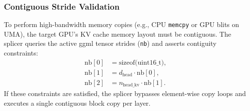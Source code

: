 \documentclass[conference,10pt]{IEEEtran}
\begin{document}
\subsubsection{Contiguous Stride Validation}
To perform high-bandwidth memory copies (e.g., CPU \texttt{memcpy} or GPU blits on UMA), the target GPU's KV cache memory layout must be contiguous. The splicer queries the active ggml tensor strides (\texttt{nb}) and asserts contiguity constraints:
\begin{align}
\text{nb}[0] &= \text{sizeof(uint16\_t)}, \\
\text{nb}[1] &= d_{\text{head}} \cdot \text{nb}[0], \\
\text{nb}[2] &= n_{\text{head\_kv}} \cdot \text{nb}[1].
\end{align}
If these constraints are satisfied, the splicer bypasses element-wise copy loops and executes a single contiguous block copy per layer.
\end{document}
